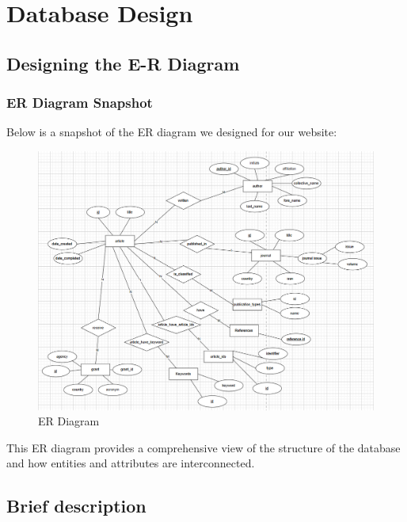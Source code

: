 \documentclass{article}
\begin{document}
\section{Database Design}
\subsection{Designing the E-R Diagram}
\subsubsection{ER Diagram Snapshot}
Below is a snapshot of the ER diagram we designed for our website:

\begin{figure}[h]
\centering %
\includegraphics[width=.8\textwidth]{poject2ER.png} %
\caption{ER Diagram} %
\label{fig:引用标签} %
\end{figure}
 

This ER diagram provides a comprehensive view of the structure of the
database and how entities and attributes are interconnected.
\newpage
\subsection{Brief description}
\end{document}
